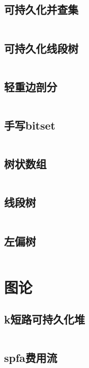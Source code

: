 \documentclass[UTF8]{ctexart}
\begin{document}
\subsection{可持久化并查集}
\inputminted{cpp}{datastructure/可持久化并查集.cpp}

\subsection{可持久化线段树}
\inputminted{cpp}{datastructure/可持久化线段树.cpp}

\subsection{轻重边剖分}
\inputminted{cpp}{datastructure/轻重边剖分.cpp}

\subsection{手写bitset}
\inputminted{cpp}{datastructure/手写bitset.cpp}

\subsection{树状数组}
\inputminted{cpp}{datastructure/树状数组.cpp}

\subsection{线段树}
\inputminted{cpp}{datastructure/线段树.cpp}

\subsection{左偏树}
\inputminted{cpp}{datastructure/左偏树.cpp}

\section{图论}

\subsection{k短路可持久化堆}
\inputminted{cpp}{graphtheory/k短路可持久化堆.cpp}

\subsection{spfa费用流}
\inputminted{cpp}{graphtheory/spfa费用流.cpp}
\end{document}
